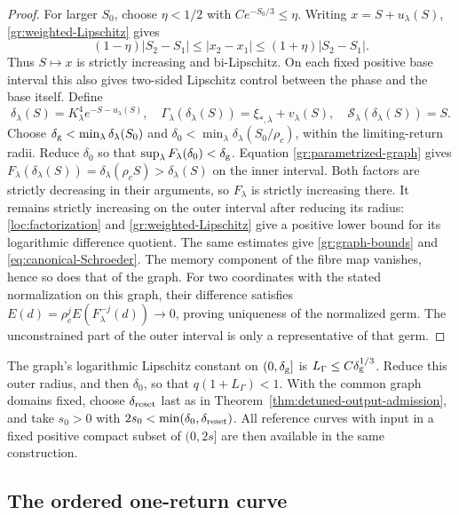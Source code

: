 \begin{proof}
For larger $S_0$, choose $\eta<1/2$ with $Ce^{-S_0/3}\le\eta$.
Writing $x=S+u_\lambda(S)$, \eqref{gr:weighted-Lipschitz} gives
\begin{equation}
 (1-\eta)|S_2-S_1|\le|x_2-x_1|
                  \le(1+\eta)|S_2-S_1|.
 \label{gr:phase-bilip}
\end{equation}
Thus $S\mapsto x$ is strictly increasing and bi-Lipschitz.
On each fixed positive base interval this also gives two-sided
Lipschitz control between the phase and the base itself. Define
\begin{equation}
 \delta_\lambda(S)=K_\lambda^4e^{-S-u_\lambda(S)},\quad
 \Gamma_\lambda(\delta_\lambda(S))=\xi_{*,\lambda}+v_\lambda(S),\quad
 \mathcal S_\lambda(\delta_\lambda(S))=S.
 \label{gr:phase-definition}
\end{equation}
Choose $\delta_{\rm g}<\min_\lambda \delta_\lambda(S_0)$ and
$\delta_0<\min_\lambda \delta_\lambda(S_0/\rho_c)$, within the
limiting-return radii. Reduce $\delta_0$ so that
$\sup_\lambda F_\lambda(\delta_0)<\delta_{\rm g}$.
Equation \eqref{gr:parametrized-graph} gives
$F_\lambda(\delta_\lambda(S))=\delta_\lambda(\rho_c S)>\delta_\lambda(S)$
on the inner interval. Both factors are strictly decreasing in their
arguments, so $F_\lambda$ is strictly increasing there. It remains
strictly increasing on the outer interval after reducing its radius:
\eqref{loc:factorization} and \eqref{gr:weighted-Lipschitz} give a
positive lower bound for its logarithmic difference quotient.
The same estimates give \eqref{gr:graph-bounds} and \eqref{eq:canonical-Schroeder}.
The memory component of the fibre map vanishes, hence so does
that of the graph.
For two coordinates with the stated normalization on this graph,
their difference satisfies
$E(d)=\rho_c^jE(F_\lambda^{-j}(d))\to0$, proving uniqueness
of the normalized germ. The unconstrained part of the outer interval
is only a representative of that germ.
\end{proof}

The graph's logarithmic Lipschitz constant on $(0,\delta_{\rm g}]$
is $L_\Gamma\le C\delta_{\rm g}^{1/3}$. Reduce this outer radius,
and then $\delta_0$, so that $q(1+L_\Gamma)<1$. With the common
graph domains fixed, choose $\delta_{\rm reset}$ last as in
Theorem~\ref{thm:detuned-output-admission}, and take $s_0>0$ with
$2s_0<\min(\delta_0,\delta_{\rm reset})$. All reference curves with
input in a fixed positive compact subset of $(0,2s]$ are then
available in the same construction.

\subsection{The ordered one-return curve}
\label{gr:ordered-reference}

